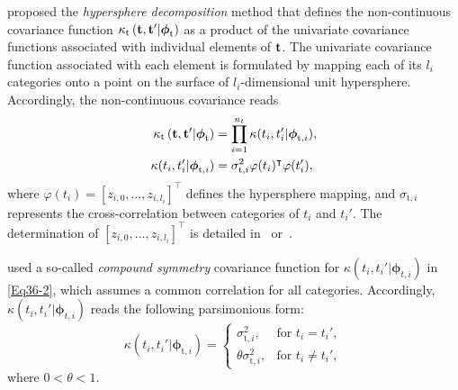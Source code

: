 \documentclass[iicol,sn-basic]{sn-jnl}%
\begin{document}
\cite{Zhou2011} proposed the \textit{hypersphere decomposition} method that defines the non-continuous covariance function $\kappa_\text{t}\left({\bf t},{\bf t}'|{\boldsymbol \phi}_\text{t}\right)$ as a product of the univariate covariance functions associated with individual elements of ${\bf t}$.
The univariate covariance function associated with each element is formulated by mapping each of its $l_i$ categories onto a point on the surface of $l_i$-dimensional unit hypersphere.
Accordingly, the non-continuous covariance reads
\begin{subequations}\label{Eq36}
	\begin{align}
		\kappa_\text{t}\left({\bf t},{\bf t}'|{\boldsymbol \phi}_\text{t}\right) & = \prod_{i=1}^{n_t}\kappa(t_i,t_i'|{\boldsymbol \phi}_{\text{t},i})
		\label{Eq36-1},\\
		\kappa(t_i,t_i'|{\boldsymbol \phi}_{\text{t},i})& =\sigma_{\text{t},i}^2\varphi(t_i)^\intercal \varphi(t_i')
		\label{Eq36-2},
	\end{align}
\end{subequations}
where $\varphi(t_i)=[z_{i,0},\dots,z_{i,l_i}]^\intercal$ defines the hypersphere mapping, and $\sigma_{\text{t},i}$ represents the cross-correlation between categories of $t_i$ and $t_i'$.
The determination of $[z_{i,0},\dots,z_{i,l_i}]^\intercal$ is detailed in~\cite{Zhou2011} or~\cite{Pelamatti2021}.

\cite{Roustant2020} used a so-called \textit{compound symmetry} covariance function for $\kappa(t_i,t_i'|{\boldsymbol \phi}_{t,i})$ in \cref{Eq36-2}, which assumes a common correlation for all categories.
Accordingly, $\kappa(t_i,t_i'|{\boldsymbol \phi}_{t,i})$ reads the following parsimonious form: 
\begin{equation}\label{Eq37}
	\kappa(t_i,t_i'|{\boldsymbol \phi}_{\text{t},i}) = 
	\begin{cases}
		\sigma_{\text{t},i}^2, & \text{for } t_i = t_i', \\
		\theta \sigma_{\text{t},i}^2, & \text{for } t_i \neq t_i',
	\end{cases}
\end{equation}
where $ 0 < \theta < 1$.
\end{document}
